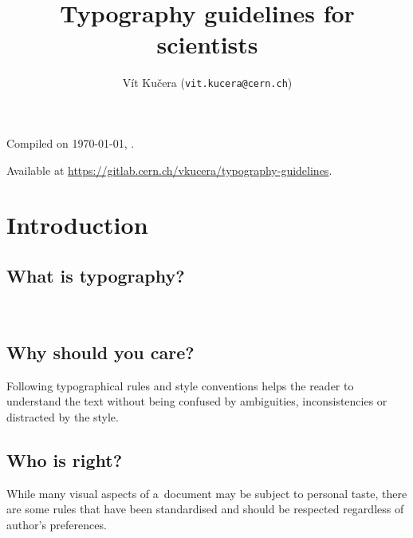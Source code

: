 \documentclass[12pt,a4paper]{article}
\author{Vít Kučera (\texttt{vit.kucera@cern.ch})}
\title{Typography guidelines for scientists}
\begin{document}
\maketitle

\begin{center}
Compiled on \today, \currenttime.

Available at \url{https://gitlab.cern.ch/vkucera/typography-guidelines}.
\end{center}


\tableofcontents


\section{Introduction}

\subsection{What is typography?}

~\cite{wiki-typography}

\subsection{Why should you care?}

Following typographical rules and style conventions helps the reader to understand the text without being confused by ambiguities, inconsistencies or distracted by the style.

\subsection{Who is right?}

While many visual aspects of a~document may be subject to personal taste, there are some rules that have been standardised and should be respected regardless of author's preferences.
\end{document}
